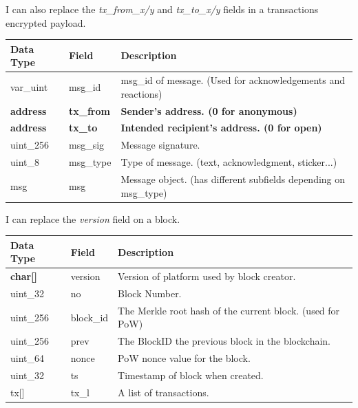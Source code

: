 \documentclass{article}
\begin{document}
I can also replace the \textit{tx\_from\_x/y} and \textit{tx\_to\_x/y} fields in a transactions encrypted payload.
\begin{table}[H]
\centering
\begin{tabular}{|p{1.3cm}|p{2.5cm}|p{5.5cm}|}
\hline
\rowcolor{tblgrey}
Data Type   & Field & Description\\ \hline
var\_uint   & msg\_id     & msg\_id of message. (Used for acknowledgements and reactions)\\ \hline
\textbf{address}     & \textbf{tx\_from}    & \textbf{Sender's address. (0 for anonymous)}      \\ \hline
\textbf{address}     & \textbf{tx\_to}      & \textbf{Intended recipient's address. (0 for open)}      \\ \hline
uint\_256   & msg\_sig    & Message signature.                             \\ \hline
uint\_8     & msg\_type   & Type of message. (text, acknowledgment, sticker...)          \\ \hline
msg         & msg         & Message object. (has different subfields depending on msg\_type) \\ \hline
\end{tabular}
\end{table}

\newpage

I can replace the \textit{version} field on a block.
\begin{table}[H]
\centering
\begin{tabular}{|p{1.3cm}|p{2.5cm}|p{5.5cm}|}
\hline
\rowcolor{tblgrey} 
Data Type   & Field      & Description                            \\ \hline
\textbf{char[\hspace{0.05cm}]}  & version     & Version of platform used by block creator.          \\ \hline
uint\_32    & no          & Block Number.                                       \\ \hline
uint\_256   & block\_id   & The Merkle root hash of the current block. (used for PoW)  \\ \hline
uint\_256   & prev        & The BlockID the previous block in the blockchain.   \\ \hline
uint\_64    & nonce       & PoW nonce value for the block.                      \\ \hline
uint\_32    & ts          & Timestamp of block when created.                    \\ \hline
tx[\hspace{0.05cm}] & tx\_l       & A list of transactions.                            \\ \hline
\end{tabular}
\end{table}
\end{document}
